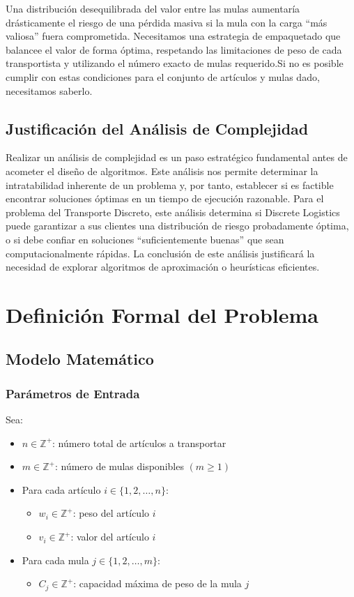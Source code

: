 \documentclass[12pt, a4paper]{article}
\begin{document}
    Una distribución desequilibrada del valor entre las mulas aumentaría drásticamente el riesgo de una pérdida masiva si la mula con la carga ``más valiosa'' fuera comprometida. Necesitamos una estrategia de empaquetado que balancee el valor de forma óptima, respetando las limitaciones de peso de cada transportista y utilizando el número exacto de mulas requerido.Si no es posible cumplir con estas condiciones para el conjunto de artículos y mulas dado, necesitamos saberlo.

    \subsection{Justificación del Análisis de Complejidad}
    Realizar un análisis de complejidad es un paso estratégico fundamental antes de acometer el diseño de algoritmos. Este análisis nos permite determinar la intratabilidad inherente de un problema y, por tanto, establecer si es factible encontrar soluciones óptimas en un tiempo de ejecución razonable. Para el problema del Transporte Discreto, este análisis determina si Discrete Logistics puede garantizar a sus clientes una distribución de riesgo probadamente óptima, o si debe confiar en soluciones ``suficientemente buenas'' que sean computacionalmente rápidas. La conclusión de este análisis justificará la necesidad de explorar algoritmos de aproximación o heurísticas eficientes.

    \section{Definición Formal del Problema}

    \subsection{Modelo Matemático}

    \subsubsection{Parámetros de Entrada}
    Sea:
    \begin{itemize}
        \item $n \in \mathbb{Z}^+$: número total de artículos a transportar
        \item $m \in \mathbb{Z}^+$: número de mulas disponibles $(m \geq 1)$
        \item Para cada artículo $i \in \{1,2,\ldots,n\}$:
        \begin{itemize}
            \item $w_i \in \mathbb{Z}^+$: peso del artículo $i$
            \item $v_i \in \mathbb{Z}^+$: valor del artículo $i$
        \end{itemize}
        \item Para cada mula $j \in \{1,2,\ldots,m\}$:
        \begin{itemize}
            \item $C_j \in \mathbb{Z}^+$: capacidad máxima de peso de la mula $j$
        \end{itemize}
    \end{itemize}
\end{document}
